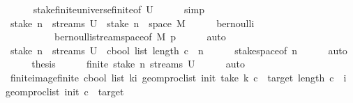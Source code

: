 \begin{isabellebody}
\ \ \ \ \isamarkupfalse%
\ stake{\isacharunderscore}{\kern0pt}finite{\isacharunderscore}{\kern0pt}universe{\isacharunderscore}{\kern0pt}finite{\isacharbrackleft}{\kern0pt}of\ {\isacharquery}{\kern0pt}U{\isacharbrackright}{\kern0pt}\isanewline
\ \ \ \ \isamarkupfalse%
\ simp\isanewline
\ \ \isamarkupfalse%
\ {\isachardoublequoteopen}stake\ n\ {\isacharbackquote}{\kern0pt}\ streams\ {\isacharquery}{\kern0pt}U\ {\isacharequal}{\kern0pt}\ stake\ n\ {\isacharbackquote}{\kern0pt}\ space\ M{\isachardoublequoteclose}\isanewline
\ \ \ \ \isamarkupfalse%
\ bernoulli\isanewline
\ \ \ \ \ \ \ \ \ \ bernoulli{\isacharunderscore}{\kern0pt}stream{\isacharunderscore}{\kern0pt}space{\isacharbrackleft}{\kern0pt}of\ M\ p{\isacharbrackright}{\kern0pt}\isanewline
\ \ \ \ \isamarkupfalse%
\ auto\isanewline
\ \ \isamarkupfalse%
\ \isamarkupfalse%
\ {\isachardoublequoteopen}stake\ n\ {\isacharbackquote}{\kern0pt}\ streams\ {\isacharquery}{\kern0pt}U\ {\isacharequal}{\kern0pt}\ {\isacharbraceleft}{\kern0pt}c{\isacharcolon}{\kern0pt}{\isacharcolon}{\kern0pt}bool\ list{\isachardot}{\kern0pt}\ length\ c\ {\isacharequal}{\kern0pt}\ n{\isacharbraceright}{\kern0pt}{\isachardoublequoteclose}\isanewline
\ \ \ \ \isamarkupfalse%
\ stake{\isacharunderscore}{\kern0pt}space{\isacharbrackleft}{\kern0pt}of\ n{\isacharbrackright}{\kern0pt}\isanewline
\ \ \ \ \isamarkupfalse%
\ auto\isanewline
\ \ \isamarkupfalse%
\ \isamarkupfalse%
\ {\isacharquery}{\kern0pt}thesis\isanewline
\ \ \ \ \isamarkupfalse%
\ {\isacartoucheopen}finite\ {\isacharparenleft}{\kern0pt}stake\ n\ {\isacharbackquote}{\kern0pt}streams\ {\isacharquery}{\kern0pt}U{\isacharparenright}{\kern0pt}{\isacartoucheclose}\isanewline
\ \ \ \ \isamarkupfalse%
\ auto\isanewline
{}\isamarkupfalse%
%
\endisatagproof
{\isafoldproof}%
%
\isadelimproof
\isanewline
%
\endisadelimproof
\ \ \ \ \isanewline
{}\isamarkupfalse%
\ finite{\isacharunderscore}{\kern0pt}image{\isacharcolon}{\kern0pt}{\isachardoublequoteopen}finite\ {\isacharbraceleft}{\kern0pt}c{\isacharcolon}{\kern0pt}{\isacharcolon}{\kern0pt}bool\ list{\isachardot}{\kern0pt}\ {\isacharparenleft}{\kern0pt}{\isasymforall}k{\isacharless}{\kern0pt}i{\isachardot}{\kern0pt}\ {\isacharparenleft}{\kern0pt}geom{\isacharunderscore}{\kern0pt}proc{\isacharunderscore}{\kern0pt}list\ init\ {\isacharparenleft}{\kern0pt}take\ k\ c{\isacharparenright}{\kern0pt}{\isacharparenright}{\kern0pt}\ {\isasymnotin}\ {\isacharbraceleft}{\kern0pt}{}{\isacharcomma}{\kern0pt}target{\isacharbraceright}{\kern0pt}{\isacharparenright}{\kern0pt}{\isasymand}\ length\ c\ {\isacharequal}{\kern0pt}\ i\ {\isasymand}\ geom{\isacharunderscore}{\kern0pt}proc{\isacharunderscore}{\kern0pt}list\ init\ c\ {\isacharequal}{\kern0pt}\ target{\isacharbraceright}{\kern0pt}{\isachardoublequoteclose}\isanewline

\end{isabellebody}
